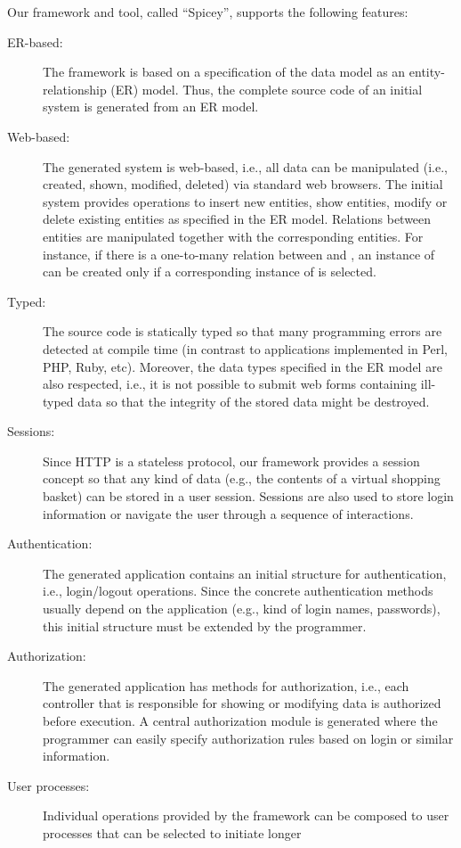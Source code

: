 \documentclass{tlp}
\begin{document}
Our framework and tool, called ``Spicey'', supports the following features:
\begin{description}
\item[ER-based:]
The framework is based on a specification of the data model
as an entity-relationship (ER) model. Thus, the complete source code
of an initial system is generated from an ER model.
\item[Web-based:]
The generated system is web-based, i.e., all data can be manipulated (i.e.,
created, shown, modified, deleted) via standard web browsers.
The initial system provides operations to insert new entities,
show entities, modify or delete existing entities
as specified in the ER model.
Relations between entities are manipulated together with
the corresponding entities. For instance, if there is a
one-to-many relation between  and ,
an instance of  can be created only if a corresponding instance
of  is selected.
\item[Typed:]
The source code is statically typed so that many programming errors are
detected at compile time (in contrast to applications implemented
in Perl, PHP, Ruby, etc). Moreover, the data types
specified in the ER model are also respected, i.e., it is not
possible to submit web forms containing ill-typed data
so that the integrity of the stored data might be destroyed.
\item[Sessions:]
Since HTTP is a stateless protocol,
our framework provides a session concept so that any kind
of data (e.g., the contents of a virtual shopping basket)
can be stored in a user session.
Sessions are also used to store login information or
navigate the user through a sequence of interactions.
\item[Authentication:]
The generated application contains an initial structure
for authentication, i.e., login/logout operations.
Since the concrete authentication methods usually depend
on the application (e.g., kind of login names, passwords),
this initial structure must be extended by the programmer.
\item[Authorization:]
The generated application has methods for authorization,
i.e., each controller that is responsible for showing or modifying
data is authorized before execution.
A central authorization module is generated where the programmer
can easily specify authorization rules based on login or similar information.
\item[User processes:]
Individual operations provided by the framework can be
composed to user processes that can be selected to initiate longer

\end{description}
\end{document}

